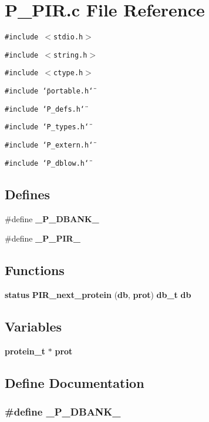\section{P\_\-PIR.c File Reference}
\label{P__PIR_8c}
{\tt \#include $<$stdio.h$>$}\par
{\tt \#include $<$string.h$>$}\par
{\tt \#include $<$ctype.h$>$}\par
{\tt \#include \char`\"{}portable.h\char`\"{}}\par
{\tt \#include \char`\"{}P\_\-defs.h\char`\"{}}\par
{\tt \#include \char`\"{}P\_\-types.h\char`\"{}}\par
{\tt \#include \char`\"{}P\_\-extern.h\char`\"{}}\par
{\tt \#include \char`\"{}P\_\-dblow.h\char`\"{}}\par
\subsection*{Defines}
\begin{CompactItemize}
\item 
\#define {\bf \_\-P\_\-DBANK\_\-}
\item 
\#define {\bf \_\-P\_\-PIR\_\-}
\end{CompactItemize}
\subsection*{Functions}
\begin{CompactItemize}
\item 
{\bf status} {\bf PIR\_\-next\_\-protein} ({\bf db}, {\bf prot}) {\bf db\_\-t} {\bf db}
\end{CompactItemize}
\subsection*{Variables}
\begin{CompactItemize}
\item 
{\bf protein\_\-t} $\ast$ {\bf prot}
\end{CompactItemize}


\subsection{Define Documentation}
\subsubsection{\setlength{\rightskip}{0pt plus 5cm}\#define \_\-P\_\-DBANK\_\-}\label{P__PIR_8c_a0}



